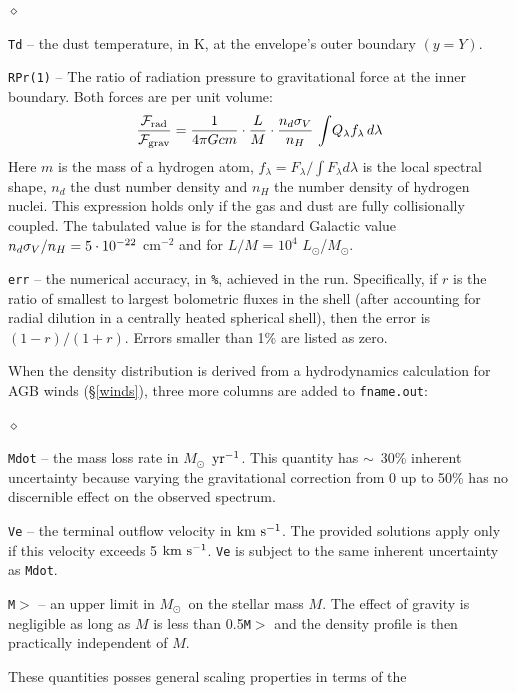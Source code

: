 \documentclass[11pt]{article}
\def\E#1{\hbox{$10^{#1}$}}
\def\eq#1{\begin{equation} #1 \end{equation}}
\def\about  {\hbox{$\sim$}}
\def\Mo     {\hbox{$M_{\odot}$}}
\def\Lo     {\hbox{$L_{\odot}$}}
\def\kms    {\hbox{$\rm km\ s^{-1}$}}
\def\sub#1{_{\rm #1}}
\def\Frad {\hbox{${\cal F}\sub{rad}$}}
\def\Fgrav{\hbox{${\cal F}\sub{grav}$}}
\begin{document}
\begin{list}{$\diamond$}{}
\item {\tt Td} -- the dust temperature, in K, at the envelope's outer
  boundary $(y = Y)$.

\item {\tt RPr(1)} -- The ratio of radiation pressure to gravitational
  force at the inner boundary. Both forces are per unit volume: \eq{
    {\Frad\over\Fgrav} = {1\over4\pi Gcm} \cdot{L\over
      M}\cdot{n_d\sigma_V\over n_H}\, \int\!Q_\lambda
    f_\lambda\,d\lambda } Here $m$ is the mass of a hydrogen atom,
  $f_\lambda = F_\lambda/\int F_\lambda d\lambda$ is the local
  spectral shape, $n_d$ the dust number density and $n_H$ the number
  density of hydrogen nuclei.  This expression holds only if the gas
  and dust are fully collisionally coupled. The tabulated value is for
  the standard Galactic value $n_d\sigma_V/n_H = 5\cdot\E{-22}$
  cm$^{-2}$ and for $L/M$ = \E4 \Lo/\Mo.

\item {\tt err} -- the numerical accuracy, in {\tt \%}, achieved in
  the run.  Specifically, if $r$ is the ratio of smallest to largest
  bolometric fluxes in the shell (after accounting for radial dilution
  in a centrally heated spherical shell), then the error is $(1 -
  r)/(1 + r)$. Errors smaller than 1\% are listed as zero.

\end{list}
When the density distribution is derived from a hydrodynamics
calculation for AGB winds (\S\ref{winds}), three more columns are
added to {\tt fname.out}:
\begin{list}{$\diamond$}{}
\item {\tt Mdot} -- the mass loss rate in \Mo\ $\rm yr^{-1}$.  This
  quantity has \about\ 30\% inherent uncertainty because varying the
  gravitational correction from 0 up to 50\% has no discernible effect
  on the observed spectrum.

\item {\tt Ve} -- the terminal outflow velocity in \kms. The provided
  solutions apply only if this velocity exceeds 5 \kms.  {\tt Ve} is
  subject to the same inherent uncertainty as {\tt Mdot}.
\item {\tt M$>$} -- an upper limit in \Mo\ on the stellar mass $M$.
  The effect of gravity is negligible as long as $M$ is less than
  0.5{\tt *M$>$} and the density profile is then practically
  independent of $M$.

\end{list}
These quantities posses general scaling properties in terms of the
\end{document}
